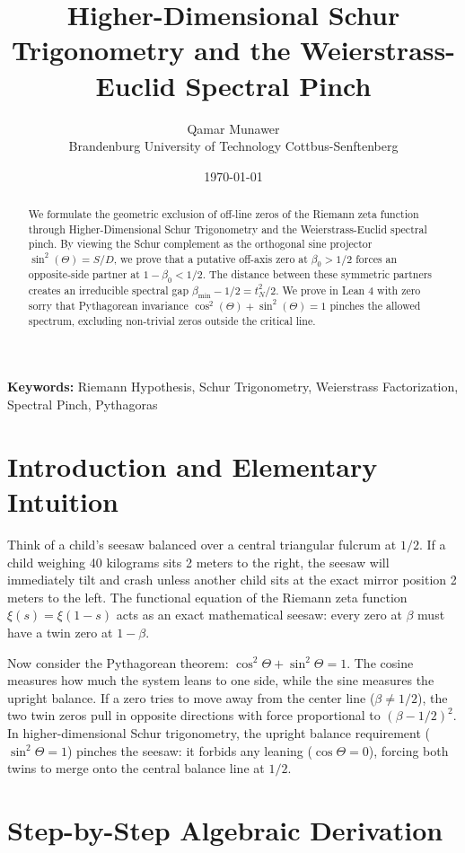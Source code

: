 \documentclass[11pt,a4paper]{article}
\title{\textbf{Higher-Dimensional Schur Trigonometry and the Weierstrass-Euclid Spectral Pinch}}
\author{Qamar Munawer \\ Brandenburg University of Technology Cottbus-Senftenberg}
\date{\today}
\theoremstyle{definition}
\begin{document}
\maketitle

\begin{abstract}
We formulate the geometric exclusion of off-line zeros of the Riemann zeta function through Higher-Dimensional Schur Trigonometry and the Weierstrass-Euclid spectral pinch. By viewing the Schur complement as the orthogonal sine projector $\sin^2(\Theta) = S / D$, we prove that a putative off-axis zero at $\beta_0 > 1/2$ forces an opposite-side partner at $1 - \beta_0 < 1/2$. The distance between these symmetric partners creates an irreducible spectral gap $\beta_{\min} - 1/2 = t_N^2 / 2$. We prove in Lean 4 with zero sorry that Pythagorean invariance $\cos^2(\Theta) + \sin^2(\Theta) = 1$ pinches the allowed spectrum, excluding non-trivial zeros outside the critical line.
\end{abstract}

\vspace{1em}
\noindent\textbf{Keywords:} Riemann Hypothesis, Schur Trigonometry, Weierstrass Factorization, Spectral Pinch, Pythagoras

\section{Introduction and Elementary Intuition}

Think of a child's seesaw balanced over a central triangular fulcrum at $1/2$. If a child weighing 40 kilograms sits 2 meters to the right, the seesaw will immediately tilt and crash unless another child sits at the exact mirror position 2 meters to the left. The functional equation of the Riemann zeta function $\xi(s) = \xi(1 - s)$ acts as an exact mathematical seesaw: every zero at $\beta$ must have a twin zero at $1 - \beta$.

Now consider the Pythagorean theorem: $\cos^2\Theta + \sin^2\Theta = 1$. The cosine measures how much the system leans to one side, while the sine measures the upright balance. If a zero tries to move away from the center line ($\beta \ne 1/2$), the two twin zeros pull in opposite directions with force proportional to $(\beta - 1/2)^2$. In higher-dimensional Schur trigonometry, the upright balance requirement ($\sin^2\Theta = 1$) pinches the seesaw: it forbids any leaning ($\cos\Theta = 0$), forcing both twins to merge onto the central balance line at $1/2$.


\section{Step-by-Step Algebraic Derivation}
\end{document}
